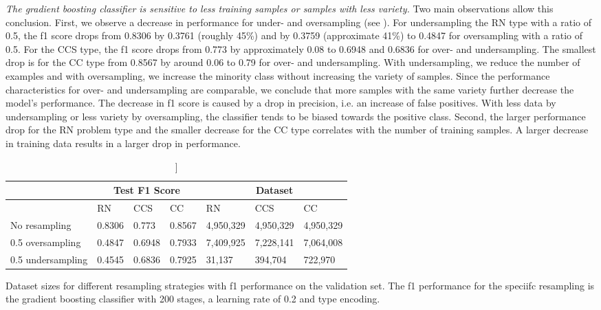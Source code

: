 \textit{The gradient boosting classifier is sensitive to less training samples or samples with less variety.} Two main observations allow this conclusion. First, we observe a decrease in performance for under- and oversampling (see  ). For undersampling the RN type with a ratio of 0.5, the f1 score drops from 0.8306 by 0.3761 (roughly 45\%) and by 0.3759 (approximate 41\%) to 0.4847 for oversampling with a ratio of 0.5. For the CCS type, the f1 score drops from 0.773 by approximately 0.08 to 0.6948 and 0.6836 for over- and undersampling. The smallest drop is for the CC type from 0.8567 by around 0.06 to 0.79 for over- and undersampling. With undersampling, we reduce the number of examples and with oversampling, we increase the minority class without increasing the variety of samples. Since the performance characteristics for over- and undersampling are comparable, we conclude that more samples with the same variety further decrease the model's performance. The decrease in f1 score is caused by a drop in precision, i.e. an increase of false positives. With less data by undersampling or less variety by oversampling, the classifier tends to be biased towards the positive class.
Second, the larger performance drop for the RN problem type and the smaller decrease for the CC type correlates with the number of training samples. A larger decrease in training data results in a larger drop in performance. 

\begin{table}[]
    \tabcolsep=0.11cm
    \begin{tabularx}{\textwidth}{lXXX|XXX}
    \toprule
                        & \multicolumn{3}{c}{Test F1 Score} & \multicolumn{3}{c}{Dataset}   \\ \midrule
                        & RN        & CCS        & CC     & RN            & CCS         & CC          \\ \midrule
    No resampling     &  0.8306   &  0.773    &  0.8567  &  4,950,329    & 4,950,329   & 4,950,329   \\
    0.5 oversampling  &  0.4847   &  0.6948   &  0.7933  &  7,409,925    & 7,228,141   & 7,064,008   \\
    0.5 undersampling &  0.4545   &  0.6836   &  0.7925  &  31,137       & 394,704     & 722,970     \\ \bottomrule
    \end{tabularx}
    \caption[Dataset sizes for different resampling strategies and performance for gradient boosting classifier]]{Dataset sizes for different resampling strategies with f1 performance on the validation set. The f1 performance for the speciifc resampling is the gradient boosting classifier with 200 stages, a learning rate of 0.2 and type encoding.}
    \label{tab:resampling_size_performance_gbc}
    \end{table}

